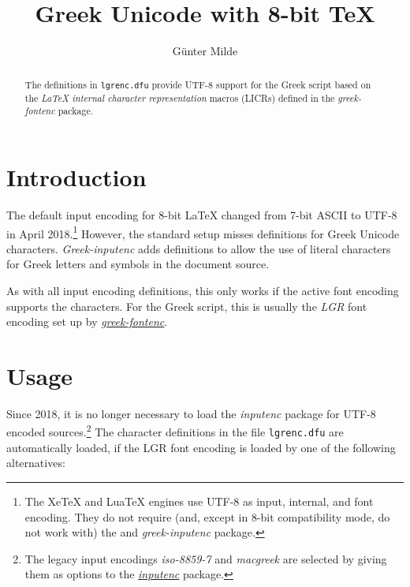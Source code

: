 \documentclass[a4paper]{article}
\begin{document}
\title{Greek Unicode with 8-bit TeX}
\author{Günter Milde}
\maketitle

\begin{abstract}
\noindent
The definitions in \texttt{lgrenc.dfu} provide UTF-8 support for the Greek
script based on the \emph{LaTeX internal character representation} macros
(LICRs) defined in the \emph{greek-fontenc} package.
\end{abstract}

\tableofcontents

\section{Introduction}

The default input encoding for 8-bit LaTeX changed from 7-bit ASCII to UTF-8
in April 2018.\footnote{%
  The XeTeX and LuaTeX engines use UTF-8 as input, internal, and font
  encoding. They do not require (and, except in 8-bit compatibility mode,
  do not work with) the and \emph{greek-inputenc} package.}
However, the standard setup misses definitions for Greek Unicode characters.
\emph{Greek-inputenc} adds definitions to allow the use of
literal characters for Greek letters and symbols in the document source.

As with all input encoding definitions, this only works if the active font
encoding supports the characters.
For the Greek script, this is usually the \emph{LGR} font encoding set up by
\href{https://ctan.org/pkg/greek-fontenc}{\emph{greek-fontenc}}.

\section{Usage}

Since 2018, it is no longer necessary to load the \emph{inputenc} package
for UTF-8 encoded sources.\footnote{%
  The legacy input encodings \emph{iso-8859-7} and
  \emph{macgreek} are selected by giving them as options to the
  \href{https://ctan.org/pkg/inputenc}{\emph{inputenc}} package.}
The character definitions in the file \texttt{lgrenc.dfu} are automatically
loaded, if the LGR font encoding is loaded by one of the following
alternatives:
\end{document}
